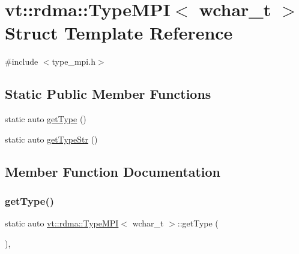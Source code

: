 \hypertarget{structvt_1_1rdma_1_1_type_m_p_i_3_01wchar__t_01_4}{}\section{vt\+:\+:rdma\+:\+:Type\+M\+PI$<$ wchar\+\_\+t $>$ Struct Template Reference}
\label{structvt_1_1rdma_1_1_type_m_p_i_3_01wchar__t_01_4}


{\ttfamily \#include $<$type\+\_\+mpi.\+h$>$}

\subsection*{Static Public Member Functions}
\begin{DoxyCompactItemize}
\item 
static auto \hyperlink{structvt_1_1rdma_1_1_type_m_p_i_3_01wchar__t_01_4_a9859c00bf0a25f752f43b1b599c3458c}{get\+Type} ()
\item 
static auto \hyperlink{structvt_1_1rdma_1_1_type_m_p_i_3_01wchar__t_01_4_a166dfb644615ae5ceab5fd65135c19bd}{get\+Type\+Str} ()
\end{DoxyCompactItemize}


\subsection{Member Function Documentation}
\mbox{\label{structvt_1_1rdma_1_1_type_m_p_i_3_01wchar__t_01_4_a9859c00bf0a25f752f43b1b599c3458c}} 
\subsubsection{\texorpdfstring{get\+Type()}{getType()}}
{\footnotesize\ttfamily static auto \hyperlink{structvt_1_1rdma_1_1_type_m_p_i}{vt\+::rdma\+::\+Type\+M\+PI}$<$ wchar\+\_\+t $>$\+::get\+Type (\begin{DoxyParamCaption}{ }\end{DoxyParamCaption})\hspace{0.3cm}{\ttfamily [inline]}, {\ttfamily [static]}}

